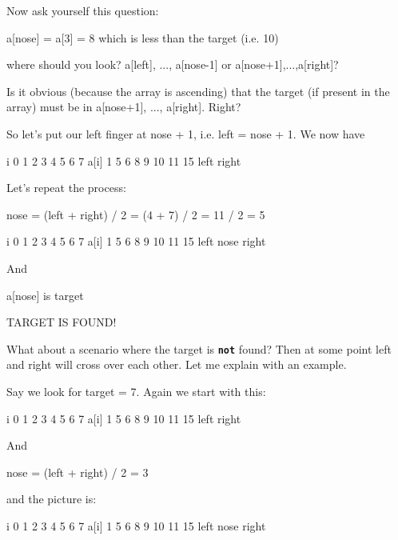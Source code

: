 Now ask yourself this question:

a[nose] = a[3] = 8 which is less than the target (i.e. 10)

where should you look? a[left], ..., a[nose-1] or a[nose+1],...,a[right]?

Is it obvious (because the array is ascending) that the target (if present in the array) must be in a[nose+1], ..., a[right]. Right?

So let's put our left finger at nose + 1, i.e. left = nose + 1. We now have

\begin{consolethree}[escapeinside=||]
i      0    1    2    3    4    5    6    7
a[i]   1    5    6    8    9    10   11   15
                          left           right
\end{consolethree}

Let's repeat the process:

nose = (left + right) / 2 = (4 + 7) / 2 = 11 / 2 = 5

\begin{consolethree}[escapeinside=||]
i      0    1    2    3    4    5    6    7
a[i]   1    5    6    8    9    10   11   15
                          left nose      right
\end{consolethree}

And
\begin{center}
a[nose] is target
\end{center}
TARGET IS FOUND!

What about a scenario where the target is \texttt{\textbf{not}} found?
Then at some point left and right will cross over each other. Let me
explain with an example.

Say we look for target = 7. Again we start with this:

\begin{consolethree}[escapeinside=||]
i      0    1    2    3    4    5    6    7
a[i]   1    5    6    8    9    10   11   15
      left                                right
\end{consolethree}

And

nose = (left + right) / 2 = 3

and the picture is:

\begin{consolethree}[escapeinside=||]
i      0    1    2    3    4    5    6    7
a[i]   1    5    6    8    9    10   11   15
      left           nose                 right
\end{consolethree}

